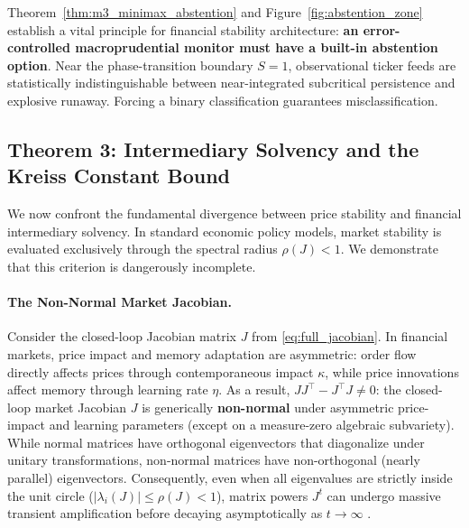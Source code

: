 \documentclass[12pt]{article}
\theoremstyle{definition}
\theoremstyle{remark}
\begin{document}
Theorem~\ref{thm:m3_minimax_abstention} and Figure~\ref{fig:abstention_zone} establish a vital principle for financial stability architecture: \textbf{an error-controlled macroprudential monitor must have a built-in abstention option}. Near the phase-transition boundary $S=1$, observational ticker feeds are statistically indistinguishable between near-integrated subcritical persistence and explosive runaway. Forcing a binary classification guarantees misclassification.

\subsection{Theorem 3: Intermediary Solvency and the Kreiss Constant Bound}
We now confront the fundamental divergence between price stability and financial intermediary solvency. In standard economic policy models, market stability is evaluated exclusively through the spectral radius $\rho(J) < 1$. We demonstrate that this criterion is dangerously incomplete.

\paragraph{The Non-Normal Market Jacobian.}
Consider the closed-loop Jacobian matrix $J$ from \eqref{eq:full_jacobian}. In financial markets, price impact and memory adaptation are asymmetric: order flow directly affects prices through contemporaneous impact $\kappa$, while price innovations affect memory through learning rate $\eta$. As a result, $J J^\top - J^\top J \neq 0$: the closed-loop market Jacobian $J$ is generically \textbf{non-normal} under asymmetric price-impact and learning parameters (except on a measure-zero algebraic subvariety). While normal matrices have orthogonal eigenvectors that diagonalize under unitary transformations, non-normal matrices have non-orthogonal (nearly parallel) eigenvectors. Consequently, even when all eigenvalues are strictly inside the unit circle ($|\lambda_i(J)| \le \rho(J) < 1$), matrix powers $J^t$ can undergo massive transient amplification before decaying asymptotically as $t \to \infty$ \citep{trefethen2005spectra}.
\end{document}
